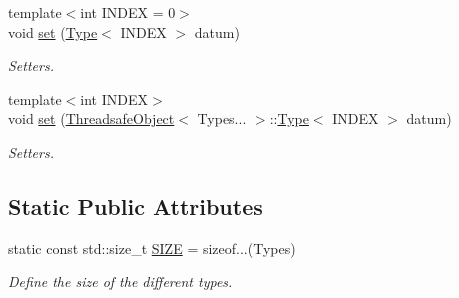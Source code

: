 \begin{DoxyCompactItemize}
{\footnotesize template$<$int I\+N\+D\+EX = 0$>$ }\\void \hyperlink{classreal__time__tools_1_1ThreadsafeObject_a57fe7089b589f905a13127c50ceb2dae}{set} (\hyperlink{classreal__time__tools_1_1ThreadsafeObject_afcbd77df1964d4fe606f1e776f1ff9b8}{Type}$<$ I\+N\+D\+EX $>$ datum)
\begin{DoxyCompactList}\small\item\em Setters. \end{DoxyCompactList}\item 
{\footnotesize template$<$int I\+N\+D\+EX$>$ }\\void \hyperlink{classreal__time__tools_1_1ThreadsafeObject_af476dc729bd9c02387d5fcf15e513448}{set} (\hyperlink{classreal__time__tools_1_1ThreadsafeObject}{Threadsafe\+Object}$<$ Types... $>$\+::\hyperlink{classreal__time__tools_1_1ThreadsafeObject_afcbd77df1964d4fe606f1e776f1ff9b8}{Type}$<$ I\+N\+D\+EX $>$ datum)
\begin{DoxyCompactList}\small\item\em Setters. \end{DoxyCompactList}\end{DoxyCompactItemize}
\subsection*{Static Public Attributes}
\begin{DoxyCompactItemize}
\item 
\mbox{\label{classreal__time__tools_1_1ThreadsafeObject_af05c02b66f0b75ea12cde9274bc2a97d}} 
static const std\+::size\+\_\+t \hyperlink{classreal__time__tools_1_1ThreadsafeObject_af05c02b66f0b75ea12cde9274bc2a97d}{S\+I\+ZE} = sizeof...(Types)
\begin{DoxyCompactList}\small\item\em Define the size of the different types. \end{DoxyCompactList}\end{DoxyCompactItemize}
